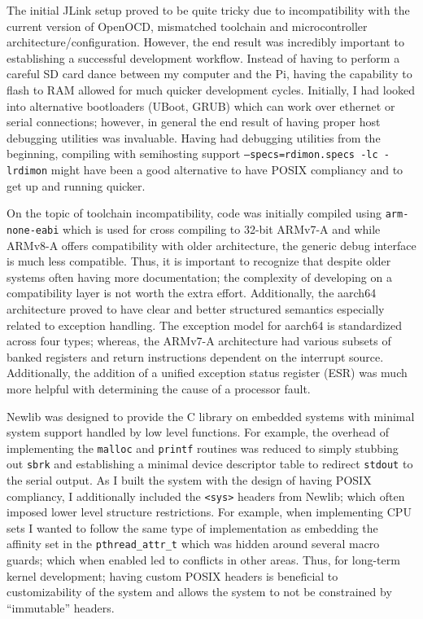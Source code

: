\documentclass[11pt]{article}
\begin{document}
The initial JLink setup proved to be quite tricky due to incompatibility with the current version of OpenOCD, mismatched toolchain and microcontroller architecture/configuration.  However, the end result was incredibly important to establishing a successful development workflow.  Instead of having to perform a careful SD card dance between my computer and the Pi, having the capability to flash to RAM allowed for much quicker development cycles.  Initially, I had looked into alternative bootloaders (UBoot, GRUB) which can work over ethernet or serial connections; however, in general the end result of having proper host debugging utilities was invaluable. Having had debugging utilities from the beginning, compiling with semihosting support \texttt{--specs=rdimon.specs -lc -lrdimon} might have been a good alternative to have POSIX compliancy and to get up and running quicker.

On the topic of toolchain incompatibility, code was initially compiled using \texttt{arm-none-eabi} which is used for cross compiling to 32-bit ARMv7-A and while ARMv8-A offers compatibility with older architecture, the generic debug interface is much less compatible.  Thus, it is important to recognize that despite older systems often having more documentation; the complexity of developing on a compatibility layer is not worth the extra effort.  Additionally, the aarch64 architecture proved to have clear and better structured semantics especially related to exception handling.  The exception model for aarch64 is standardized across four types; whereas, the ARMv7-A architecture had various subsets of banked registers and return instructions dependent on the interrupt source.  Additionally, the addition of a unified exception status register (ESR) was much more helpful with determining the cause of a processor fault.

Newlib was designed to provide the C library on embedded systems \cite{newlib} with minimal system support handled by low level functions.  For example, the overhead of implementing the \texttt{malloc} and \texttt{printf} routines was reduced to simply stubbing out \texttt{sbrk} and establishing a minimal device descriptor table to redirect \texttt{stdout} to the serial output.  As I built the system with the design of having POSIX compliancy, I additionally included the \texttt{<sys>} headers from Newlib; which often imposed lower level structure restrictions.  For example, when implementing CPU sets I wanted to follow the same type of implementation as embedding the affinity set in the \texttt{pthread\_attr\_t} which was hidden around several macro guards; which when enabled led to conflicts in other areas.  Thus, for long-term kernel development; having custom POSIX headers is beneficial to customizability of the system and allows the system to not be constrained by ``immutable'' headers.
\end{document}

